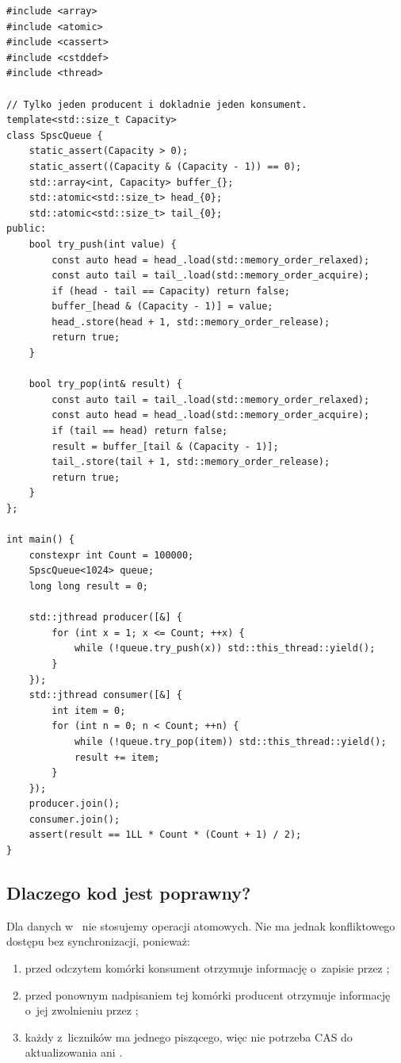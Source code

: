 \begin{lstlisting}[caption={Kompletna kolejka SPSC dla int, ze statyczną pamięcią (C++20).}]
#include <array>
#include <atomic>
#include <cassert>
#include <cstddef>
#include <thread>

// Tylko jeden producent i dokladnie jeden konsument.
template<std::size_t Capacity>
class SpscQueue {
    static_assert(Capacity > 0);
    static_assert((Capacity & (Capacity - 1)) == 0);
    std::array<int, Capacity> buffer_{};
    std::atomic<std::size_t> head_{0};
    std::atomic<std::size_t> tail_{0};
public:
    bool try_push(int value) {
        const auto head = head_.load(std::memory_order_relaxed);
        const auto tail = tail_.load(std::memory_order_acquire);
        if (head - tail == Capacity) return false;
        buffer_[head & (Capacity - 1)] = value;
        head_.store(head + 1, std::memory_order_release);
        return true;
    }

    bool try_pop(int& result) {
        const auto tail = tail_.load(std::memory_order_relaxed);
        const auto head = head_.load(std::memory_order_acquire);
        if (tail == head) return false;
        result = buffer_[tail & (Capacity - 1)];
        tail_.store(tail + 1, std::memory_order_release);
        return true;
    }
};

int main() {
    constexpr int Count = 100000;
    SpscQueue<1024> queue;
    long long result = 0;

    std::jthread producer([&] {
        for (int x = 1; x <= Count; ++x) {
            while (!queue.try_push(x)) std::this_thread::yield();
        }
    });
    std::jthread consumer([&] {
        int item = 0;
        for (int n = 0; n < Count; ++n) {
            while (!queue.try_pop(item)) std::this_thread::yield();
            result += item;
        }
    });
    producer.join();
    consumer.join();
    assert(result == 1LL * Count * (Count + 1) / 2);
}
\end{lstlisting}

\subsection{Dlaczego kod jest poprawny?}

Dla danych w~ nie stosujemy operacji atomowych.
Nie ma jednak konfliktowego dostępu bez synchronizacji, ponieważ:
\begin{enumerate}
\item przed odczytem komórki konsument otrzymuje informację o~zapisie
      przez ;
\item przed ponownym nadpisaniem tej komórki producent otrzymuje
      informację o~jej zwolnieniu przez ;
\item każdy z~liczników ma jednego piszącego, więc nie potrzeba CAS
      do aktualizowania  ani .
\end{enumerate}

